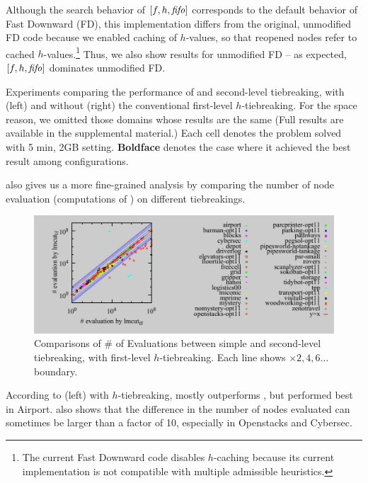 Although the search behavior of $[f,h,\mbox{\textit{fifo}}]$ corresponds to the default behavior of Fast Downward (FD), this implementation differs 
from the original, unmodified FD code because we enabled caching of $h$-values, so that reopened nodes refer to cached $h$-values.\footnote{The current Fast Downward code disables $h$-caching because its current implementation is not compatible with multiple admissible heuristics.}
Thus, we also show results for unmodified FD -- as expected, $[f,h,\mbox{\textit{fifo}}]$ dominates unmodified FD.

\begin{table}[tb]
 \centering {}
 
 
 \caption{Experiments comparing the performance of \fifo and \lifo
 second-level tiebreaking, with (left) and without (right) the
 conventional first-level $h$-tiebreaking.  For the space reason, we
 omitted those domains whose results are the same (Full results are
 available in the supplemental material.) Each cell denotes the problem
 solved with 5 min, 2GB setting. \textbf{Boldface} denotes the case
 where it achieved the best result among configurations.}
 \label{single-coverage}
\end{table}

 also gives us a
more fine-grained analysis by comparing the number of node evaluation
(computations of \lmcut) on different tiebreakings.

\begin{figure}[tb]
 \centering {}
 \includegraphics{tables/aaai16-30min/aaai16prelim3/evaluated-lmcut_ff-lmcut_lf.pdf}
 \caption{Comparisons of \# of Evaluations between simple \lifo and
 \fifo second-level tiebreaking, with first-level $h$-tiebreaking. Each
 line shows $\times 2,4,6\ldots$ boundary.}  \label{f-h-eval}
\end{figure}

According to  (left) with $h$-tiebreaking, \lifo
mostly outperforms \fifo, but \fifo performed best in Airport.
 also shows that the difference in the number of nodes
evaluated can sometimes be larger than a factor of 10, especially in
Openstacks and Cybersec.

